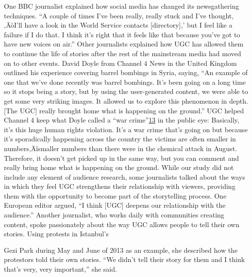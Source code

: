 \documentclass[symmetric, notoc, nobib]{towcenter-book}
\begin{document}
One BBC journalist explained how social media has changed its newsgathering
techniques. ``A couple of times I've been really, really stuck and I've
thought, ‚ÄòI'll have a look in the World Service contacts [directory],' but I feel
like a failure if I do that. I think it's right that it feels like that because you've
got to have new voices on air.''
Other journalists explained how UGC has allowed them to continue the
life of stories after the rest of the mainstream media had moved on to other
events. David Doyle from Channel 4 News in the United Kingdom outlined
his experience covering barrel bombings in Syria, saying, ``An example of
one that we've done recently was barrel bombings. It's been going on a long
time so it stops being a story, but by using the user-generated content, we
were able to get some very striking images. It allowed us to explore this
phenomenon in depth. [The UGC] really brought home what is happening
on the ground.''
UGC helped Channel 4 keep what Doyle called a ``war crime''{\href{#endnotes}{13}} in the
public eye:
Basically, it's this huge human rights violation. It's a war crime that's
going on but because it's sporadically happening across the country
the victims are often smaller in numbers‚Äîsmaller numbers than
there were in the chemical attack in August. Therefore, it doesn't get
picked up in the same way, but you can comment and really bring
home what is happening on the ground.
While our study did not include any element of audience research, some
journalists talked about the ways in which they feel UGC strengthens their
relationship with viewers, providing them with the opportunity to become
part of the storytelling process. One European editor argued, ``I think [UGC]
deepens our relationship with the audience.'' Another journalist, who works
daily with communities creating content, spoke passionately about the way
UGC allows people to tell their own stories. Using protests in Istanbul's

Gezi Park during May and June of 2013 as an example, she described how
the protestors told their own stories. ``We didn't tell their story for them and
I think that's very, very important,'' she said.
\end{document}
